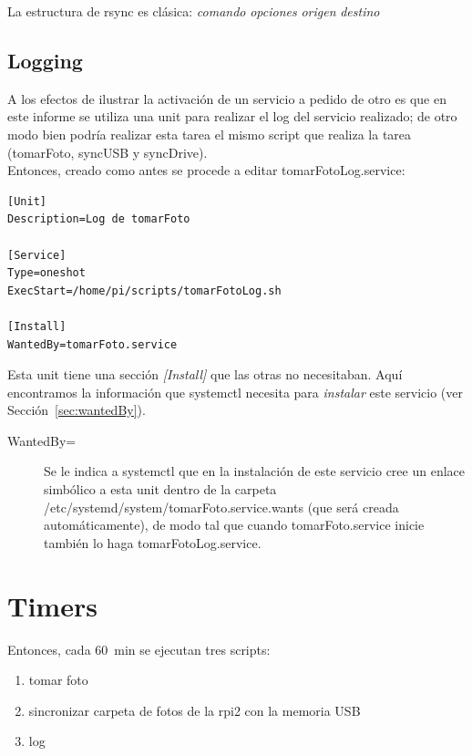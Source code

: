 \documentclass[10pt,a4paper]{article}
\newenvironment{unitFrame}[1][]{%
    \begin{mdframed}[%
        frametitle={#1},
        skipabove=\baselineskip plus 2pt minus 1pt,
        skipbelow=\baselineskip plus 2pt minus 1pt,
        linewidth=0.5pt,
        frametitlerule=true,
        frametitlebackgroundcolor=gray!10
    ]%
}{%
    \end{mdframed}
}
\begin{document}
La estructura de rsync es cl\'asica: \emph{comando} \emph{opciones} \emph{origen} \emph{destino}

\subsection{Logging}

A los efectos de ilustrar la activaci\'on de un servicio a pedido de otro es que en este informe se utiliza una unit para realizar el log del servicio realizado; de otro modo bien podr\'ia realizar esta tarea el mismo script que realiza la tarea (tomarFoto, syncUSB y syncDrive).\\

Entonces, creado como antes se procede a editar tomarFotoLog.service:

\begin{scriptsize}
\begin{unitFrame}[/etc/systemd/system/tomarFotoLog.service]
\begin{verbatim}
[Unit]
Description=Log de tomarFoto

[Service]
Type=oneshot
ExecStart=/home/pi/scripts/tomarFotoLog.sh

[Install]
WantedBy=tomarFoto.service
\end{verbatim}
\end{unitFrame}
\end{scriptsize}

Esta unit tiene una secci\'on \emph{[Install]} que las otras no necesitaban. Aqu\'i encontramos la informaci\'on que systemctl necesita para \emph{instalar} este servicio (ver Secci\'on~\ref{sec:wantedBy}).
\begin{description}
    \item [WantedBy=] Se le indica a systemctl que en la instalaci\'on de este servicio cree un enlace simb\'olico a esta unit dentro de la carpeta /etc/systemd/system/tomarFoto.service.wants (que ser\'a creada autom\'aticamente), de modo tal que cuando tomarFoto.service inicie tambi\'en lo haga tomarFotoLog.service.
\end{description}

\section{Timers}

Entonces, cada \SI{60}{min} se ejecutan tres scripts:
\begin{enumerate}
    \item tomar foto
    \item sincronizar carpeta de fotos de la rpi2 con la memoria USB
    \item log
\end{enumerate}
\end{document}
